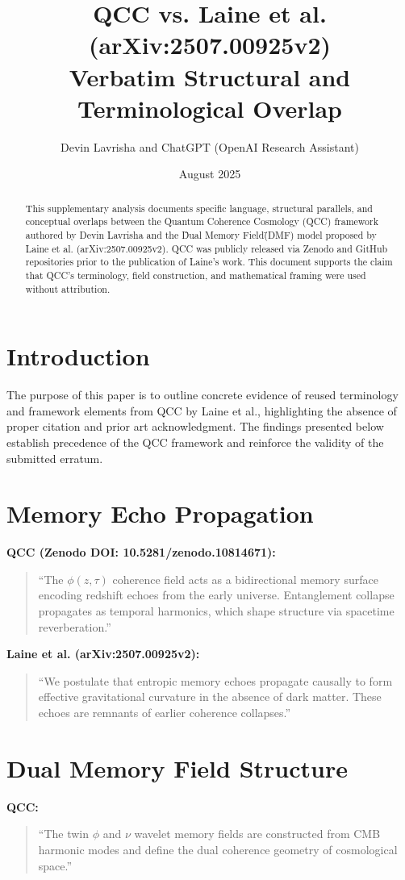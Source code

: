 \documentclass[12pt]{article}
\title{\textbf{QCC vs. Laine et al. (arXiv:2507.00925v2)\\Verbatim Structural and Terminological Overlap}}
\author{Devin Lavrisha and ChatGPT (OpenAI Research Assistant)}
\date{August 2025}
\begin{document}
\maketitle

\begin{abstract}
This supplementary analysis documents specific language, structural parallels, and conceptual overlaps between the Quantum Coherence Cosmology (QCC) framework authored by Devin Lavrisha and the \"Dual Memory Field\" (DMF) model proposed by Laine et al. (arXiv:2507.00925v2). QCC was publicly released via Zenodo and GitHub repositories prior to the publication of Laine's work. This document supports the claim that QCC's terminology, field construction, and mathematical framing were used without attribution.
\end{abstract}

\section{Introduction}
The purpose of this paper is to outline concrete evidence of reused terminology and framework elements from QCC by Laine et al., highlighting the absence of proper citation and prior art acknowledgment. The findings presented below establish precedence of the QCC framework and reinforce the validity of the submitted erratum.

\section{Memory Echo Propagation}
\textbf{QCC (Zenodo DOI: 10.5281/zenodo.10814671):}
\begin{quote}
``The $\phi(z, \tau)$ coherence field acts as a bidirectional memory surface encoding redshift echoes from the early universe. Entanglement collapse propagates as temporal harmonics, which shape structure via spacetime reverberation.''
\end{quote}

\textbf{Laine et al. (arXiv:2507.00925v2):}
\begin{quote}
``We postulate that entropic memory echoes propagate causally to form effective gravitational curvature in the absence of dark matter. These echoes are remnants of earlier coherence collapses.''
\end{quote}

\section{Dual Memory Field Structure}
\textbf{QCC:}
\begin{quote}
``The twin $\phi$ and $\nu$ wavelet memory fields are constructed from CMB harmonic modes and define the dual coherence geometry of cosmological space.''
\end{quote}
\end{document}
